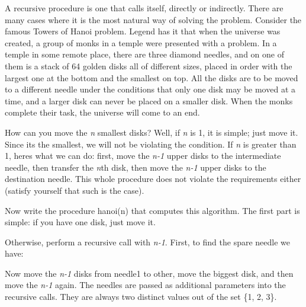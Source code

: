 A recursive procedure is one that calls itself,
directly or indirectly. There are many cases where it is the most
natural way of solving the problem. Consider the famous
{\textquotedbl}Towers of Hanoi{\textquotedbl} problem.
Legend has it that when the universe was created, a group of monks in a
temple were presented with a problem. In a temple in some remote place,
there are three diamond needles, and on one of them is a
stack of 64 golden disks all of different sizes, placed in
order with the largest one at the bottom and the smallest on top. All
the disks are to be moved to a different needle under the conditions
that only one disk may be moved at a time, and a larger disk can never
be placed on a smaller disk. When the monks complete their task, the
universe will come to an end.

How can you move the \textit{n} smallest disks? Well, if \textit{n} is
1, it is simple; just move it. Since it{\textquotesingle}s the
smallest, we will not be violating the condition. If \textit{n} is
greater than 1, here{\textquotesingle}s what we can do: first, move the
\textit{n-1} upper disks to the intermediate needle, then transfer the
\textit{n}th disk, then move the \textit{n-1} upper disks to the
destination needle. This whole procedure does not violate the
requirements either (satisfy yourself that such is the case).

Now write the procedure \textsf{hanoi(n)} that computes this algorithm.
The first part is simple: if you have one disk, just move it.


Otherwise, perform a recursive call with \textit{n-1}. First, to find
the spare needle we have:


Now move the \textit{n-1} disks from \textsf{needle1} to \textsf{other},
move the biggest disk, and then move the \textit{n-1} again. The
needles are passed as additional parameters into the recursive calls.
They are always two distinct values out of the set \{1, 2, 3\}.


